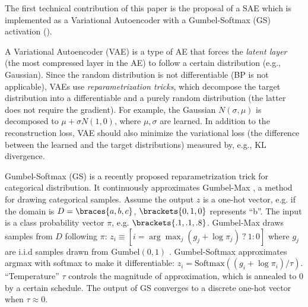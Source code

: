 \documentclass[11pt]{article}
\begin{document}
The first technical contribution of this paper is the proposal of a SAE which is implemented as 
a Variational Autoencoder \cite{kingma2014semi} with a Gumbel-Softmax (GS) activation \cite{jang2016categorical} ().
% 

A Variational Autoencoder (VAE) \cite{kingma2013auto} is a type of AE that forces the \emph{latent layer} (the most compressed layer in the AE) to follow a certain distribution (e.g., Gaussian).
Since the random distribution is not differentiable (BP is not applicable), VAEs use \emph{reparametrization tricks}, which decompose the target distribution into a differentiable and a purely random distribution (the latter does not require the gradient).
For example, the Gaussian $N(\sigma,\mu)$ is decomposed to $\mu+\sigma N(1,0)$, where $\mu,\sigma$ are learned.
In addition to the reconstruction loss, VAE should also minimize the variational loss (the difference between the learned and the target distributions) measured by, e.g.,  KL divergence.

Gumbel-Softmax (GS) is a recently proposed re\-para\-metri\-zation trick \cite{jang2016categorical} for categorical distribution.
It continuously approximates Gumbel-Max \cite{maddison2014sampling}, a method for drawing categorical samples.
Assume the output $z$ is a one-hot vector, e.g. if the domain is $D=\braces{a,b,c}$, $\brackets{0,1,0}$ represents ``b''.
The input is a class probability vector $\pi$, e.g. $\brackets{.1,.1,.8}$.
Gumbel-Max draws samples from $D$ following $\pi$:
 $z_i \equiv [ i = \arg \max_j (g_j+\log \pi_j)\ ?\ 1 : 0 ]$
where $g_j$ are i.i.d samples drawn from Gumbel$(0,1)$ \cite{gumbel1954statistical}.
Gumbel-Softmax approximates argmax with softmax to make it differentiable:
$z_i = \text{Softmax}((g_i+\log \pi_i)/\tau)$.
``Temperature'' $\tau$ controls the magnitude of approximation, which is annealed to 0 by a certain schedule.
The output of GS converges to a discrete one-hot vector when $\tau\approx 0$.
\end{document}
